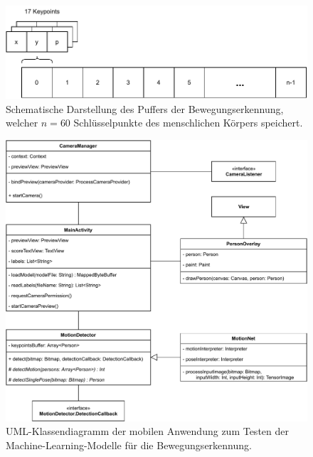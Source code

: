 \begin{figure}
    \includegraphics[width=\textwidth]{images/camera_frame_buffer.pdf}
    \caption{Schematische Darstellung des Puffers der Bewegungserkennung,
    welcher $n = 60$ Schlüsselpunkte des menschlichen Körpers speichert.}
    \label{fig:camera-frame-buffer}
\end{figure}

\begin{figure}
    \includegraphics[width=\textwidth]{images/app_uml.pdf}
    \caption{UML-Klassendiagramm der mobilen Anwendung zum Testen der
    Machine-Learning-Modelle für die Bewegungserkennung.}
    \label{fig:uml-app}
\end{figure}

